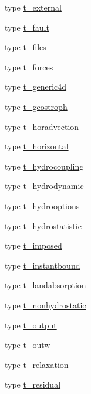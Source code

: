 \begin{DoxyCompactItemize}
type \mbox{\hyperlink{structmodulehydrodynamic_1_1t__external}{t\+\_\+external}}
\item 
type \mbox{\hyperlink{structmodulehydrodynamic_1_1t__fault}{t\+\_\+fault}}
\item 
type \mbox{\hyperlink{structmodulehydrodynamic_1_1t__files}{t\+\_\+files}}
\item 
type \mbox{\hyperlink{structmodulehydrodynamic_1_1t__forces}{t\+\_\+forces}}
\item 
type \mbox{\hyperlink{structmodulehydrodynamic_1_1t__generic4d}{t\+\_\+generic4d}}
\item 
type \mbox{\hyperlink{structmodulehydrodynamic_1_1t__geostroph}{t\+\_\+geostroph}}
\item 
type \mbox{\hyperlink{structmodulehydrodynamic_1_1t__horadvection}{t\+\_\+horadvection}}
\item 
type \mbox{\hyperlink{structmodulehydrodynamic_1_1t__horizontal}{t\+\_\+horizontal}}
\item 
type \mbox{\hyperlink{structmodulehydrodynamic_1_1t__hydrocoupling}{t\+\_\+hydrocoupling}}
\item 
type \mbox{\hyperlink{structmodulehydrodynamic_1_1t__hydrodynamic}{t\+\_\+hydrodynamic}}
\item 
type \mbox{\hyperlink{structmodulehydrodynamic_1_1t__hydrooptions}{t\+\_\+hydrooptions}}
\item 
type \mbox{\hyperlink{structmodulehydrodynamic_1_1t__hydrostatistic}{t\+\_\+hydrostatistic}}
\item 
type \mbox{\hyperlink{structmodulehydrodynamic_1_1t__imposed}{t\+\_\+imposed}}
\item 
type \mbox{\hyperlink{structmodulehydrodynamic_1_1t__instantbound}{t\+\_\+instantbound}}
\item 
type \mbox{\hyperlink{structmodulehydrodynamic_1_1t__landabsorption}{t\+\_\+landabsorption}}
\item 
type \mbox{\hyperlink{structmodulehydrodynamic_1_1t__nonhydrostatic}{t\+\_\+nonhydrostatic}}
\item 
type \mbox{\hyperlink{structmodulehydrodynamic_1_1t__output}{t\+\_\+output}}
\item 
type \mbox{\hyperlink{structmodulehydrodynamic_1_1t__outw}{t\+\_\+outw}}
\item 
type \mbox{\hyperlink{structmodulehydrodynamic_1_1t__relaxation}{t\+\_\+relaxation}}
\item 
type \mbox{\hyperlink{structmodulehydrodynamic_1_1t__residual}{t\+\_\+residual}}
\item 

\end{DoxyCompactItemize}
